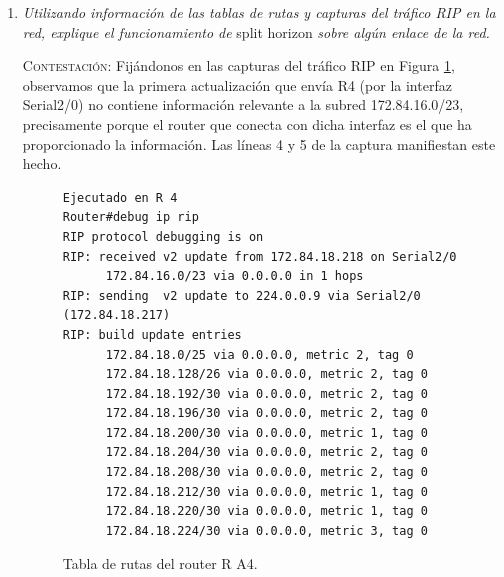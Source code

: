 \documentclass[11pt]{article}
\begin{document}
\begin{enumerate}
En cuanto a los aspectos más relevantes:
\begin{enumerate}
    \item Las entradas que aparecen con una \texttt{C} son las subredes que están directamente conectadas al router.
    \item Entre corchetes, aparece en primer lugar la distancia administrativa correspondiente a RIP (120) y en segundo lugar la distacia a la que se encuentra dicha subred, que en el caso de RIP es el número de saltos necesarios.
    \item Por último, nos indica por cuál de nuestras interfaces debemos salir y la IP de nuestro próximo salto.
\end{enumerate}

$\hfill\square$

\vspace{12px}

    \item \textit{Utilizando información de las tablas de rutas y capturas del tráfico RIP
en la red,
explique el funcionamiento de} split horizon \textit{sobre algún enlace de la
red.}

\vspace{7px}

\textsc{Contestación}: Fijándonos en las capturas del tráfico RIP en Figura \ref{fig:2.1.1.2}, observamos que la primera actualización que envía R4 (por la interfaz Serial2/0) no contiene información relevante a la subred 172.84.16.0/23, precisamente porque el router que conecta con dicha interfaz es el que ha proporcionado la información. Las líneas 4 y 5 de la captura manifiestan este hecho.

\begin{figure}[h]
\begin{verbatim}
Ejecutado en R 4
Router#debug ip rip
RIP protocol debugging is on
RIP: received v2 update from 172.84.18.218 on Serial2/0
      172.84.16.0/23 via 0.0.0.0 in 1 hops
RIP: sending  v2 update to 224.0.0.9 via Serial2/0 (172.84.18.217)
RIP: build update entries
      172.84.18.0/25 via 0.0.0.0, metric 2, tag 0
      172.84.18.128/26 via 0.0.0.0, metric 2, tag 0
      172.84.18.192/30 via 0.0.0.0, metric 2, tag 0
      172.84.18.196/30 via 0.0.0.0, metric 2, tag 0
      172.84.18.200/30 via 0.0.0.0, metric 1, tag 0
      172.84.18.204/30 via 0.0.0.0, metric 2, tag 0
      172.84.18.208/30 via 0.0.0.0, metric 2, tag 0
      172.84.18.212/30 via 0.0.0.0, metric 1, tag 0
      172.84.18.220/30 via 0.0.0.0, metric 1, tag 0
      172.84.18.224/30 via 0.0.0.0, metric 3, tag 0
\end{verbatim}
\caption{Tabla de rutas del router R A4.}
\label{fig:2.1.1.2}
\end{figure}


\end{enumerate}
\end{document}
